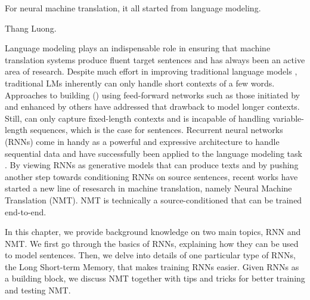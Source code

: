 \epigraph{For neural machine translation, it all started from language
modeling.}{Thang Luong.}

Language modeling plays an
indispensable role in ensuring that machine translation systems produce fluent target
sentences and has always been an active area of research.
Despite much effort in improving traditional \ngram{} language models
\cite{rosenfeld2000,srilm,teh2006,irstlm,kenlm,pauls2011,heafield13},
traditional LMs inherently can only handle short
contexts of a few words. Approaches to building \nlmtext{} (\nlms) using
feed-forward networks such as those initiated by  and
enhanced by others \cite{Morin2005,Bengio08,MnihHinton2009,MnihTeh2012} have %
addressed that drawback to model longer contexts.
Still, \nlms{} can only capture fixed-length contexts and is
incapable of handling variable-length sequences, which is the case for sentences.
Recurrent neural networks (RNNs) come in handy as a powerful and expressive
architecture to handle sequential data and have successfully been applied to the
language modeling task \cite{MikolovKBCK10,MikolovKBCK11,mikolovLM}.
By viewing RNNs as generative models \cite{Sutskever11} that can produce texts 
and by pushing another step towards conditioning RNNs on source sentences, recent works
\cite{kal13,sutskever14,cho14} have started a new line of resesarch in machine translation, namely Neural
Machine Translation (NMT). NMT is technically a source-conditioned \nlm{} that
can be trained end-to-end.



In this chapter, we provide background knowledge on two main topics, RNN and NMT.
We first go through the basics of RNNs, explaining how they can be used to model sentences. 
Then, we delve into details of one particular type of RNNs, the Long Short-term Memory, that makes training RNNs easier.
Given RNNs as a building block, we discuss NMT together with tips and tricks for better training and testing NMT.

